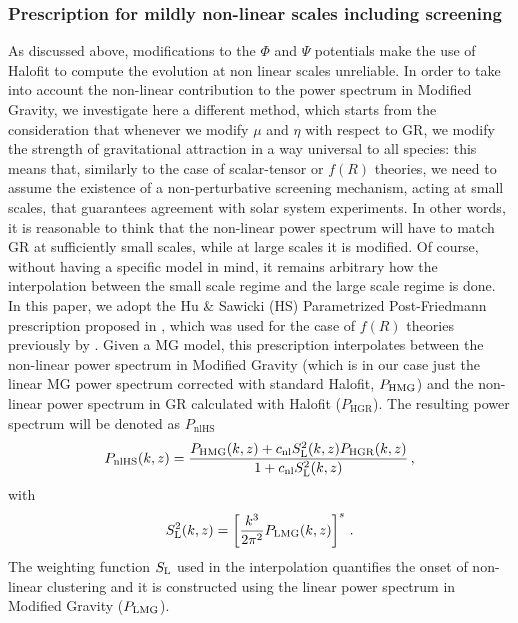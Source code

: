 \subsubsection{Prescription for mildly non-linear scales including screening}
\label{sub:Prescription-HS}

As discussed above, modifications to the $\Phi$ and $\Psi$ 
potentials make the use of Halofit to compute the evolution at non linear scales 
unreliable. In order to
take into account the non-linear contribution to the power spectrum
in Modified Gravity, we investigate here a different method, which
starts from the consideration that whenever we
modify $\mu$ and $\eta$ with respect to GR, we modify the strength
of gravitational attraction in a way universal to all species: this
means that, similarly to the case of scalar-tensor or $f(R)$ theories,
we need to assume the existence of a non-perturbative screening mechanism, acting at
small scales, that guarantees agreement with solar system experiments.
In other words, it is reasonable to think that the non-linear power
spectrum will have to match GR at sufficiently small scales, while
at large scales it is modified. Of course, without having a specific model in mind, it remains arbitrary
how the interpolation between the small scale regime and the large
scale regime is done. In this
paper, we adopt the Hu \& Sawicki (HS) Parametrized Post-Friedmann prescription proposed
in \cite{hu_parameterized_2007}, which was used for the case of $f(R)$
theories previously by \cite{zhao_modeling_2014}. Given a MG model,
this prescription interpolates between the non-linear power spectrum
in Modified Gravity (which is in our case just the linear MG power
spectrum corrected with standard Halofit, $P_{\mathrm{HMG}}$) and the non-linear
power spectrum in GR calculated with Halofit ($P_{\mathrm{HGR}}$). The resulting
power spectrum will be denoted as $P_{\mathrm{nlHS}}$
\begin{equation}
P_{\mathrm{nlHS}}(k,z)=\frac{P_{\mathrm{HMG}}(k,z)+c_{\mathrm{nl}} S_{\mathrm{L}}^{2}(k,z)P_{\mathrm{HGR}}(k,z)}{1+c_{\mathrm{nl}} S_{\mathrm{L}}^{2}(k,z)} \, ,\label{eq:PHSDefinition}
\end{equation}
with 
\begin{equation}
S_{\mathrm{L}}^{2}(k,z)=\left[\frac{k^{3}}{2\pi^{2}}P_{\mathrm{LMG}}(k,z)\right]^{s} \, . \label{eq:prescription_sigma_def}
\end{equation}
The weighting function $S_{\mathrm{L}}$ used in the interpolation quantifies the onset of non-linear clustering and it is constructed
using the linear power spectrum in Modified Gravity ($P_{\mathrm{LMG}}$).
